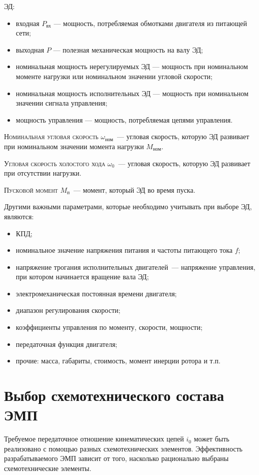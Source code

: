  ЭД:
\begin{itemize}
	\item входная $ P_\text{вх} $ --- мощность, потребляемая обмотками двигателя из питающей сети;
	\item выходная $ P $ --- полезная механическая мощность на валу ЭД;
	\item номинальная мощность нерегулируемых ЭД --- мощность при номинальном моменте нагрузки или номинальном значении угловой скорости;
	\item номинальная мощность исполнительных ЭД --- мощность при номинальном значении сигнала управления;
	\item мощность управления --- мощность, потребляемая цепями управления.
\end{itemize}

\noindent
\textsc{Номинальная угловая скорость} $ \omega_\text{ном} $~--- угловая скорость, которую ЭД развивает при номинальном значении момента нагрузки $ M_\text{ном} $.

\noindent
\textsc{Угловая скорость холостого хода} $ \omega_0 $~--- угловая скорость, которую ЭД развивает при отсутствии нагрузки.

\noindent
\textsc{Пусковой момент} $ M_\text{п} $~--- момент, который ЭД во время пуска.

Другими важными параметрами, которые необходимо учитывать при выборе ЭД, являются:
\begin{itemize}
	\item КПД;
	\item номинальное значение напряжения питания и частоты питающего тока $ f $;
	\item напряжение трогания исполнительных двигателей~--- напряжение управления, при котором начинается вращение вала ЭД;
	\item электромеханическая постоянная времени двигателя;
	\item диапазон регулирования скорости;
	\item коэффициенты управления по моменту, скорости, мощности;
	\item передаточная функция двигателя;
	\item прочие: масса, габариты, стоимость, момент инерции ротора и т.п.
\end{itemize}

\section{Выбор схемотехнического состава ЭМП}
Требуемое передаточное отношение кинематических цепей $ i_0 $ может быть реализовано с помощью разных схемотехнических элементов.
Эффективность разрабатываемого ЭМП зависит от того, насколько рационально выбраны схемотехнические элементы.

